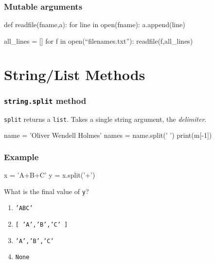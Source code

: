 \documentclass[11pt]{beamer}
\begin{document}
\begin{frame}[fragile]
  \frametitle{Mutable arguments}
  \Enlarge

  \begin{semiverbatim}
def readfile(fname,a):
    for line in open(fname):
        a.append(line)

all_lines = []
for f in open(“filenames.txt”):
    readfile(f,all_lines)
  \end{semiverbatim}
\end{frame}

\section{String/List Methods}

\begin{frame}[fragile]
  \frametitle{\texttt{string.split} method}
  \Enlarge

  \begin{itemize}
  \myitem  \texttt{split} returns a \texttt{list}.
  \myitem  Takes a single string argument, the \emph{delimiter}.
  \end{itemize}
  \begin{semiverbatim}
name = 'Oliver Wendell Holmes'
names = name.split(' ')
print(m[-1])
  \end{semiverbatim}
\end{frame}

\begin{frame}[fragile]
  \frametitle{Example}
  \Enlarge

  \begin{semiverbatim}
x = 'A+B+C'
y = x.split('+')
  \end{semiverbatim}
  What is the final value of \texttt{y}?
  \begin{enumerate}[label=\Alph*]
  \item  \texttt{'ABC'}
  \item  \texttt{[ 'A','B','C' ]}
  \item  \texttt{'A','B','C'}
  \item  \texttt{None}
  \end{enumerate}
\end{frame}
\end{document}
